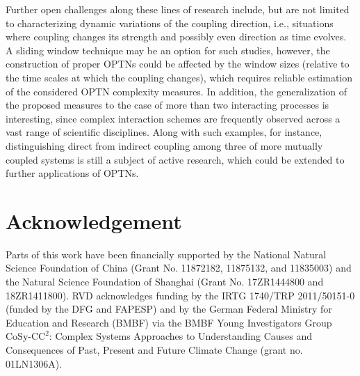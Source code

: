 \documentclass[12pt,aip,cha,reprint,nofootinbib]{revtex4-1}
\begin{document}
Further open challenges along these lines of research include, but are not limited to characterizing dynamic variations of the coupling direction, i.e., situations where coupling changes its strength and possibly even direction as time evolves. A sliding window technique may be an option for such studies, however, the construction of proper OPTNs could be affected by the window sizes (relative to the time scales at which the coupling changes), which requires reliable estimation of the considered OPTN complexity measures. In addition, the generalization of the proposed measures to the case of more than two interacting processes is interesting, since complex interaction schemes are frequently observed across a vast range of scientific disciplines. Along with such examples, for instance, distinguishing direct from indirect coupling among three of more mutually coupled systems is still a subject of active research, which could be extended to further applications of OPTNs. 

\section*{Acknowledgement}
Parts of this work have been financially supported by the National Natural Science Foundation of China (Grant No. 11872182, 11875132, and 11835003) and the Natural Science Foundation of Shanghai (Grant No. 17ZR1444800 and 18ZR1411800). RVD acknowledges funding by the IRTG 1740/TRP 2011/50151-0 (funded by the DFG and FAPESP) and by the German Federal Ministry for Education and Research (BMBF) via the BMBF Young Investigators Group $\text{CoSy-CC}^2$: Complex Systems Approaches to Understanding Causes and Consequences of Past, Present and Future Climate Change (grant no. 01LN1306A).

%

\end{document}
